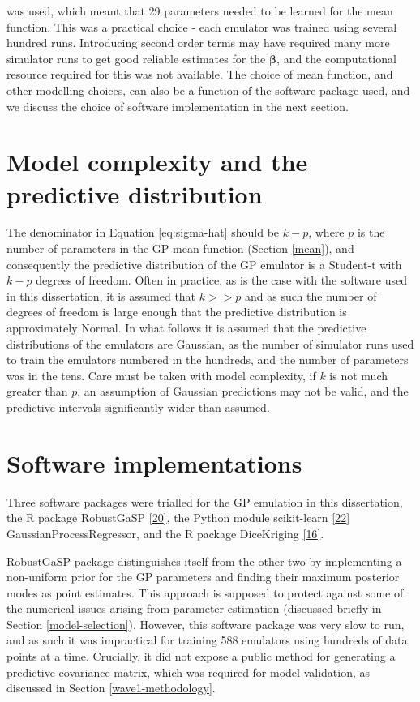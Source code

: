 \documentclass[
  12pt,
  a4paper,
  twoside]{book}
\begin{document}
was used, which meant that 29 parameters needed to be learned for the mean function. This was a practical choice - each emulator was trained using several hundred runs. Introducing second order terms may have required many more simulator runs to get good reliable estimates for the \(\mathbf{\beta}\), and the computational resource required for this was not available.
The choice of mean function, and other modelling choices, can also be a function of the software package used, and we discuss the choice of software implementation in the next section.

\hypertarget{model-complexity-and-the-predictive-distribution}{%
\section{Model complexity and the predictive distribution}\label{model-complexity-and-the-predictive-distribution}}

The denominator in Equation \eqref{eq:sigma-hat} should be \(k-p\), where \(p\) is the number of parameters in the GP mean function (Section \ref{mean}), and consequently the predictive distribution of the GP emulator is a Student-t with \(k-p\) degrees of freedom. Often in practice, as is the case with the software used in this dissertation, it is assumed that \(k>>p\) and as such the number of degrees of freedom is large enough that the predictive distribution is approximately Normal. In what follows it is assumed that the predictive distributions of the emulators are Gaussian, as the number of simulator runs used to train the emulators numbered in the hundreds, and the number of parameters was in the tens. Care must be taken with model complexity, if \(k\) is not much greater than \(p\), an assumption of Gaussian predictions may not be valid, and the predictive intervals significantly wider than assumed.

\hypertarget{gp-software}{%
\section{Software implementations}\label{gp-software}}

Three software packages were trialled for the GP emulation in this dissertation, the R package RobustGaSP \protect\hyperlink{ref-rgasp_manual}{{[}20{]}}, the Python module scikit-learn \protect\hyperlink{ref-scikit}{{[}22{]}} GaussianProcessRegressor, and the R package DiceKriging \protect\hyperlink{ref-dicekriging}{{[}16{]}}.

RobustGaSP package distinguishes itself from the other two by implementing a non-uniform prior for the GP parameters and finding their maximum posterior modes as point estimates. This approach is supposed to protect against some of the numerical issues arising from parameter estimation (discussed briefly in Section \ref{model-selection}). However, this software package was very slow to run, and as such it was impractical for training 588 emulators using hundreds of data points at a time. Crucially, it did not expose a public method for generating a predictive covariance matrix, which was required for model validation, as discussed in Section \ref{wave1-methodology}.
\end{document}
